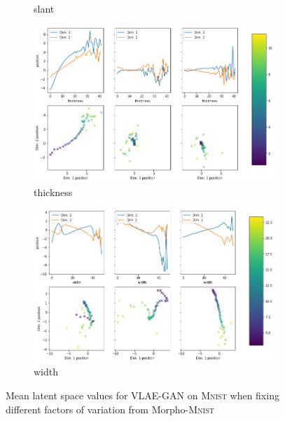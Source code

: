 \begin{figure}[H]
\begin{subfigure}{.48\textwidth}
        \caption{slant}
    \end{subfigure}
    \hfill
    \begin{subfigure}{.48\textwidth}
        \includegraphics[width=\textwidth]{images/latent_space_traversals/vlae_gan_mnist_morpho_latent_space_values_thickness.png}
        \caption{thickness}
    \end{subfigure}
    \begin{subfigure}{.48\textwidth}
        \includegraphics[width=\textwidth]{images/latent_space_traversals/vlae_gan_mnist_morpho_latent_space_values_width.png}
        \caption{width}
    \end{subfigure}
    \caption{Mean latent space values for \ac{VLAE}-\ac{GAN} on \textsc{Mnist} when fixing different factors of variation from Morpho-\textsc{Mnist}}
    \label{fig:appendix_vlae_gan_mnist_latent_space_morpho}

\end{figure}

